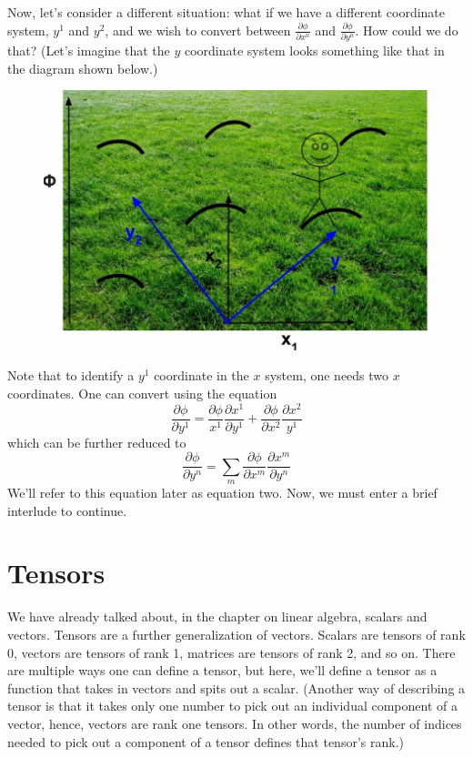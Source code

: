 Now, let's consider a different situation: what if we have a different coordinate system, $y^1$ and $y^2$, and we wish to convert between $\frac{\partial\phi}{\partial x^n}$ and $\frac{\partial\phi}{\partial y^n}$. How could we do that? (Let's imagine that the $y$ coordinate system looks something like that in the diagram shown below.)
\begin{figure}[H]
    \centering
    \includegraphics[scale=0.25]{newcor.jpg}
\end{figure}
Note that to identify a $y^1$ coordinate in the $x$ system, one needs two $x$ coordinates. One can convert using the equation 
\begin{equation*}
    \frac{\partial\phi}{\partial y^1}=\frac{\partial\phi}{x^1}\frac{\partial x^1}{\partial y^1}+\frac{\partial\phi}{\partial x^2}\frac{\partial x^2}{y^1}
\end{equation*}
which can be further reduced to
\begin{equation}
    \frac{\partial\phi}{\partial y^n}=\sum\limits_m\frac{\partial\phi}{\partial x^m}\frac{\partial x^m}{\partial y^n}
\end{equation}
We'll refer to this equation later as equation two. Now, we must enter a brief interlude to continue.
\section{Tensors}
We have already talked about, in the chapter on linear algebra, scalars and vectors. Tensors are a further generalization of vectors. Scalars are tensors of rank 0, vectors are tensors of rank 1, matrices are tensors of rank 2, and so on. There are multiple ways one can define a tensor, but here, we'll define a tensor as a function that takes in vectors and spits out a scalar. (Another way of describing a tensor is that it takes only one number to pick out an individual component of a vector, hence, vectors are rank one tensors. In other words, the number of indices needed to pick out a component of a tensor defines that tensor's rank.)

